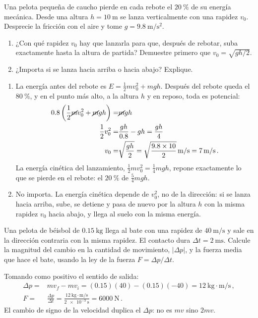 \documentclass[12pt, a4paper]{article}
\begin{document}
\begin{exercise}[ID=rebote-lanzamiento, tags={banco}]
Una pelota pequeña de caucho pierde en cada rebote el $\qty{20}{\percent}$ de su energía mecánica. Desde una altura $h=\qty{10}{\m}$ se lanza verticalmente con una rapidez $v_0$. Desprecie la fricción con el aire y tome $g=\qty{9.8}{\m/\s^2}$.
\begin{enumerate}
    \item ¿Con qué rapidez $v_0$ hay que lanzarla para que, después de rebotar, suba exactamente hasta la altura de partida? Demuestre primero que $v_0=\sqrt{gh/2}$.
    \item ¿Importa si se lanza hacia arriba o hacia abajo? Explique.
\end{enumerate}
\end{exercise}
\begin{solution}
\begin{enumerate}
    \item La energía antes del rebote es $E=\frac{1}{2}mv_0^2+mgh$. Después del rebote queda el $\qty{80}{\percent}$, y en el punto más alto, a la altura $h$ y en reposo, toda es potencial:
    \begin{align}
        0.8\left(\frac{1}{2}\cancel{m}v_0^2+\cancel{m}gh\right) =& \cancel{m}gh\nonumber\\
        \frac{1}{2}v_0^2 =& \frac{gh}{0.8}-gh = \frac{gh}{4}\nonumber\\
        v_0 =& \sqrt{\frac{gh}{2}} = \sqrt{\frac{9.8\times 10}{2}}\,\unit{\m/\s} = \qty{7}{\m/\s}\,.
    \end{align}
    La energía cinética del lanzamiento, $\frac{1}{2}mv_0^2=\frac{1}{4}mgh$, repone exactamente lo que se pierde en el rebote: el $\qty{20}{\percent}$ de $\frac{5}{4}mgh$.
    \item No importa. La energía cinética depende de $v_0^2$, no de la dirección: si se lanza hacia arriba, sube, se detiene y pasa de nuevo por la altura $h$ con la misma rapidez $v_0$ hacia abajo, y llega al suelo con la misma energía.
\end{enumerate}
\end{solution}

\begin{exercise}[ID=impulso, tags={banco}]
Una pelota de béisbol de $\qty{0.15}{\kilo\g}$ llega al bate con una rapidez de $\qty{40}{\m/\s}$ y sale en la dirección contraria con la misma rapidez. El contacto dura $\Delta t=\qty{2}{\milli\s}$. Calcule la magnitud del cambio en la cantidad de movimiento, $\lvert\Delta p\rvert$, y la fuerza media que hace el bate, usando la ley de la fuerza $F=\Delta p/\Delta t$.
\end{exercise}
\begin{solution}
Tomando como positivo el sentido de salida:
\begin{align}
    \Delta p =& m v_f - m v_i = (0.15)(40) - (0.15)(-40) = \qty{12}{\kilo\g\cdot\m/\s}\,,\nonumber\\
    F =& \frac{\Delta p}{\Delta t} = \frac{\qty{12}{\kilo\g\cdot\m/\s}}{\qty{2e-3}{\s}} = \qty{6000}{\N}\,.
\end{align}
El cambio de signo de la velocidad duplica el $\Delta p$: no es $mv$ sino $2mv$.
\end{solution}
\end{document}
